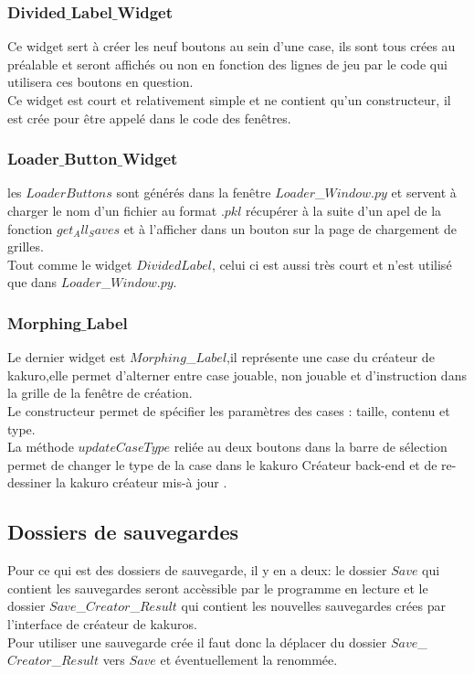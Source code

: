 \documentclass[french,12pt]{article}
\begin{document}
\newpage
\subsubsection{Divided$\_$Label$\_$Widget}

Ce widget sert à créer les neuf boutons au sein d'une case, ils sont tous crées au préalable et seront affichés ou non en fonction des lignes de jeu par le code qui utilisera ces boutons en question. \\
Ce widget est court et relativement simple et ne contient qu'un constructeur, il est crée pour être appelé dans le code des fenêtres. 

\subsubsection{Loader$\_$Button$\_$Widget}

les $LoaderButtons$ sont générés dans la fenêtre $Loader$\_$Window.py$ et servent à charger le nom d'un fichier au format $.pkl$ récupérer à la suite d'un apel de la fonction $get_All_Saves$ et à l'afficher dans un bouton sur la page de chargement de grilles. \\
Tout comme le widget $DividedLabel$, celui ci est aussi très court et n'est utilisé que dans $Loader$\_$Window.py$.



\subsubsection{Morphing$\_$Label}

Le dernier widget est $Morphing$\_$Label$,il représente une case du créateur de kakuro,elle permet d'alterner entre case jouable, non jouable et d'instruction dans la grille de la fenêtre de création. \\
Le constructeur permet de spécifier les paramètres des cases : taille, contenu et type.  \\
La méthode $updateCaseType$ reliée au deux boutons dans la barre de sélection  permet de changer le type de la case dans le kakuro Créateur back-end et de re-dessiner la kakuro créateur mis-à jour .

\subsection{Dossiers de sauvegardes}

Pour ce qui est des dossiers de sauvegarde, il y en a deux:  le dossier $Save$ qui contient les sauvegardes seront accèssible par le programme en lecture et le dossier $Save$\_$Creator$\_$Result$ qui contient les nouvelles sauvegardes crées par l'interface de créateur de kakuros. \\
Pour utiliser une sauvegarde crée il faut donc la déplacer du dossier $Save$\_$Creator$\_$Result$ vers $Save$ et éventuellement la renommée.
\end{document}
